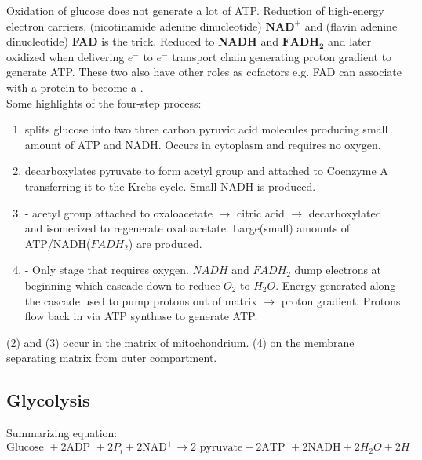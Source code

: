 \documentclass[../Bio_chemistryReview.tex]{subfiles}
\begin{document}
Oxidation of glucose does not generate a lot of ATP. Reduction of high-energy
electron carriers, (nicotinamide adenine dinucleotide) $ \boldsymbol{NAD^{+} }$
and (flavin adenine dinucleotide) \textbf{FAD} is the trick. Reduced to
\textbf{NADH} and $\boldsymbol{FADH_{2}}$ and later oxidized when delivering $
e^{-} $ to $ e^{-} $ transport chain generating proton gradient to generate ATP.
These two also have other roles as cofactors e.g. FAD can associate with a
protein to become a .\\ Some highlights of the four-step
process:
\begin{infobox}
  \begin{enumerate}
    \item {} splits glucose into two three carbon pyruvic acid
      molecules producing small amount of ATP and NADH. Occurs in cytoplasm and
      requires no oxygen.  
    \item {}
      decarboxylates pyruvate to form acetyl group and attached to Coenzyme A
      transferring it to the Krebs cycle. Small NADH is produced.  
    \item {} - acetyl group attached to oxaloacetate $
      \rightarrow $ citric acid $ \rightarrow $ decarboxylated and isomerized to
      regenerate oxaloacetate. Large(small) amounts of ATP/NADH($ FADH_{2} $)
      are produced.  
    \item {} - Only stage that requires
      oxygen. $ NADH \text{ and } FADH_{2} $ dump electrons at beginning which
      cascade down to reduce $ O_{2} \text{ to } H_{2}O $. Energy generated
      along the cascade used to pump protons out of matrix $ \rightarrow $
      proton gradient. Protons flow back in via ATP synthase to generate ATP. 
  \end{enumerate}
\end{infobox}

(2) and (3) occur in the matrix of mitochondrium. (4) on the membrane separating
matrix from outer compartment.

\subsection{Glycolysis}	

Summarizing equation:
\[ \text{Glucose } + 2 \text{ADP }+ 2 P_{i} + 2\text{NAD}^{+} \rightarrow 2 \text{ pyruvate} + 2\text{ATP } + 2 \text{NADH} + 2 H_{2}O + 2H^{+} \]
\end{document}
